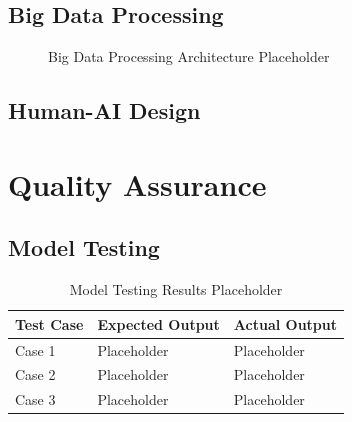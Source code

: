 \documentclass[12pt, a4paper]{report}
\begin{document}
\section{Big Data Processing}

\lipsum[18][1-4]

\begin{figure}[H]
    \centering
    \fbox{\rule{0pt}{4cm}\rule{0.75\textwidth}{0pt}}
    \caption{Big Data Processing Architecture Placeholder}
    \label{fig:big-data}
\end{figure}

\lipsum[19][1-2]

\section{Human-AI Design}

\lipsum[20][1-4]

\chapter{Quality Assurance}

\lipsum[21][1-3]

\section{Model Testing}

\lipsum[22][1-4]

\begin{table}[H]
    \centering
    \caption{Model Testing Results Placeholder}
    \begin{tabular}{lll}
        \toprule
        \textbf{Test Case} & \textbf{Expected Output} & \textbf{Actual Output} \\
        \midrule
        Case 1 & Placeholder & Placeholder \\
        Case 2 & Placeholder & Placeholder \\
        Case 3 & Placeholder & Placeholder \\
        \bottomrule
    \end{tabular}
    \label{tab:model-testing}
\end{table}
\end{document}

